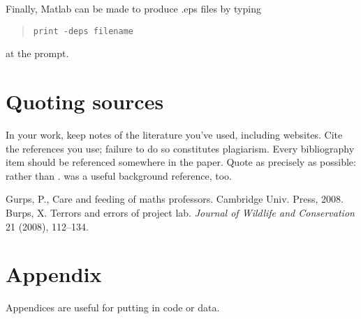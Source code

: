 \documentclass[12pt]{amsart}   %
\begin{document}

Finally, Matlab can be made to produce .eps files by typing
\begin{quote}
{\tt print -deps filename}
\end{quote}
at the prompt. 



\section{Quoting sources\label{sec:bibliography}}

In your work, keep notes of the literature you've used, including websites. Cite the references you use; failure to do so constitutes plagiarism. Every bibliography item should be referenced somewhere in the paper.
Quote as precisely as possible: \cite[pages 76--78]{gurps} rather than \cite{gurps}. \cite{wildlife} was a useful background reference, too. 



\begin{thebibliography}{9}
Gurps, P., Care and feeding of maths professors. Cambridge Univ. Press, 2008.
Burps, X. Terrors and errors of project lab. {\em Journal of Wildlife and Conservation} 21 (2008), 112--134.
\end{thebibliography}

\section*{Appendix}
Appendices are useful for putting in code or data.
\end{document}
